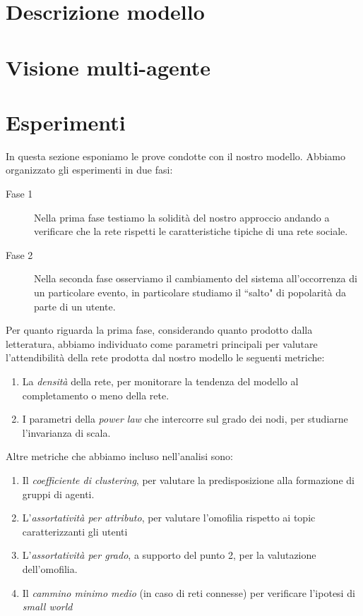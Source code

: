 \documentclass[a4paper,12pt]{article}
\begin{document}
\section{Descrizione modello} 
\label{sec:mod}
\section{Visione multi-agente}
\label{sec:mas}
\section{Esperimenti}
\label{sec:esp}
In questa sezione esponiamo le prove condotte con il nostro modello. 
Abbiamo organizzato gli esperimenti in due fasi: 
\begin{description}
\item[Fase 1] Nella prima fase testiamo la solidità del nostro approccio andando a verificare che la rete rispetti le caratteristiche tipiche di una rete sociale.
\item[Fase 2] Nella seconda fase osserviamo il cambiamento del sistema all'occorrenza di un particolare evento, in particolare studiamo il ``salto" di popolarità da parte di un utente.
\end{description}
Per quanto riguarda la prima fase, considerando quanto prodotto dalla letteratura, abbiamo individuato come parametri principali per valutare l'attendibilità della rete prodotta dal nostro modello le seguenti metriche:
\begin{enumerate}
    \item La \textit{densità} della rete, per monitorare la tendenza del modello al completamento o meno della rete.
    \item I parametri della \textit{power law} che intercorre sul grado dei nodi, per studiarne l'invarianza di scala.
\end{enumerate}
Altre metriche che abbiamo incluso nell'analisi sono:
\begin{enumerate}
    \item Il \textit{coefficiente di clustering}, per valutare la predisposizione alla formazione di gruppi di agenti.
    \item L'\textit{assortatività per attributo}, per valutare l'omofilia rispetto ai topic caratterizzanti gli utenti
    \item L'\textit{assortatività per grado}, a supporto del punto 2, per la valutazione dell'omofilia.
    \item Il \textit{cammino minimo medio} (in caso di reti connesse) per verificare l'ipotesi di \textit{small world}
\end{enumerate}
\end{document}

